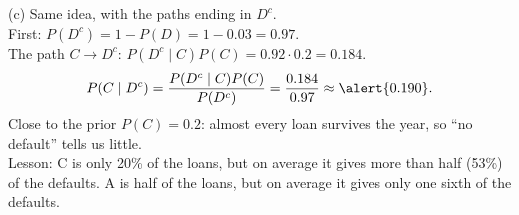 \begin{slides}
	\small
	(c) Same idea, with the paths ending in $D^c$.
	\pause\\[1mm]
	First: $P(D^c)=1-P(D)=1-0.03=0.97$.
	\pause\\[1mm]
	The path $C\to D^c$: $P(D^c\mid C)P(C)=0.92\cdot0.2=0.184$.
	\pause
	\[ P(C\mid D^c)=\frac{P(D^c\mid C)P(C)}{P(D^c)}=\frac{0.184}{0.97}
		\approx\alert{0.190}. \]
	\pause
	Close to the prior $P(C)=0.2$: almost every loan survives the year, so
	``no default'' tells us little.
	\pause\\[2mm]
	\alert{Lesson:} C is only 20\% of the loans, but on average it gives more
	than half (53\%) of the defaults. A is half of the loans, but on average it
	gives only one sixth of the defaults.
\end{slides}

